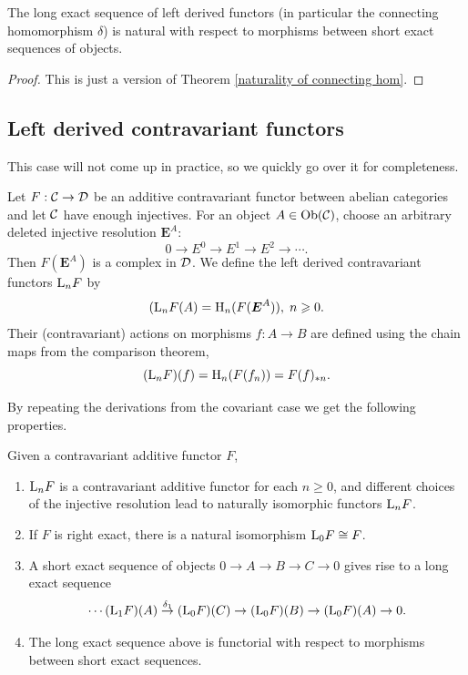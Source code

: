 \begin{prop}
    The long exact sequence of left derived functors (in particular the connecting homomorphism $\delta$) is natural with respect to morphisms between short exact sequences of objects.
\end{prop}
\begin{proof}
    This is just a version of Theorem \ref{naturality of connecting hom}.
\end{proof}




\subsection{Left derived contravariant functors}


This case will not come up in practice, so we quickly go over it for completeness.

\begin{defn}
    Let $F:\mathcal{C}\to \mathcal{D}$ be an additive contravariant functor between abelian categories and let $\mathcal{C}$ have enough injectives. For an object $A\in\operatorname{Ob}(\mathcal{C})$, choose an arbitrary deleted injective resolution $\bm{E}^A$:
    \[0\to E^0\to E^1\to E^2\to\cdots.\]
    Then $F(\bm{E}^A)$ is a complex in $\mathcal{D}$. We define the left derived contravariant functors $\mathrm{L}_nF$ by
    \[(\mathrm{L}_nF(A)=\mathrm{H}_n(F(\boldsymbol{E}^A)),\; n\geqslant 0.\]
    Their (contravariant) actions on morphisms $f:A\to B$ are defined using the chain maps from the comparison theorem,
    \[(\mathrm{L}_nF)(f)=\mathrm{H}_n(F(f_n))=F(f)_{\ast n}.\]
\end{defn}

By repeating the derivations from the covariant case we get the following properties.

\begin{thm}
    Given a contravariant additive functor $F$, 
    \begin{enumerate}
        \item $\mathrm{L}_nF$ is a contravariant additive functor for each $n\geq 0$, and different choices of the injective resolution lead to naturally isomorphic functors $\mathrm{L}_nF$.
        \item If $F$ is right exact, there is a natural isomorphism $\mathrm{L}_0F\cong F$.
        \item A short exact sequence of objects $0\to A\to B\to C\to 0$ gives rise to a long exact sequence
        \[\cdots (\mathrm{L}_1F)(A)\overset{\delta_1}{\to} (\mathrm{L}_0F)(C)\to (\mathrm{L}_0F)(B)\to (\mathrm{L}_0F)(A)\to 0.\]
        \item The long exact sequence above is functorial with respect to morphisms between short exact sequences.
    \end{enumerate}
\end{thm}






